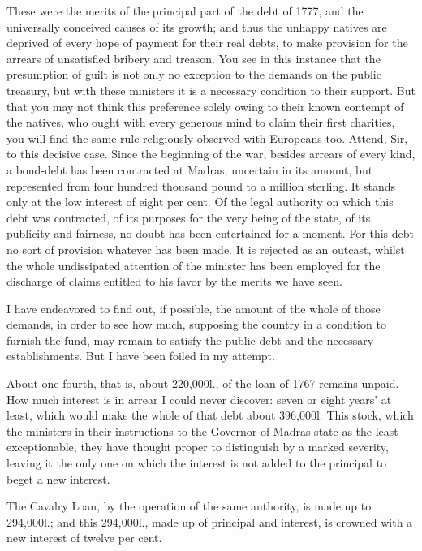 These were the merits of the principal part of the debt of 1777, and the universally conceived causes of its growth; and thus the unhappy natives are deprived of every hope of payment for their real debts, to make provision for the arrears of unsatisfied bribery and treason. You see in this instance that the presumption of guilt is not only no exception to the demands on the public treasury, but with these ministers it is a necessary condition to their support. But that you may not think this preference solely owing to their known contempt of the natives, who ought with every generous mind to claim their first charities, you will find the same rule religiously observed with Europeans too. Attend, Sir, to this decisive case. Since the beginning of the war, besides arrears of every kind, a bond-debt has been contracted at Madras, uncertain in its amount, but represented from four hundred thousand pound to a million sterling. It stands only at the low interest of eight per cent. Of the legal authority on which this debt was contracted, of its purposes for the very being of the state, of its publicity and fairness, no doubt has been entertained for a moment. For this debt no sort of provision whatever has been made. It is rejected as an outcast, whilst the whole undissipated attention of the minister has been employed for the discharge of claims entitled to his favor by the merits we have seen.

I have endeavored to find out, if possible, the amount of the whole of those demands, in order to see how much, supposing the country in a condition to furnish the fund, may remain to satisfy the public debt and the necessary establishments. But I have been foiled in my attempt.

About one fourth, that is, about 220,000l., of the loan of 1767 remains unpaid. How much interest is in arrear I could never discover: seven or eight years' at least, which would make the whole of that debt about 396,000l. This stock, which the ministers in their instructions to the Governor of Madras state as the least exceptionable, they have thought proper to distinguish by a marked severity, leaving it the only one on which the interest is not added to the principal to beget a new interest.

The Cavalry Loan, by the operation of the same authority, is made up to 294,000l.; and this 294,000l., made up of principal and interest, is crowned with a new interest of twelve per cent.

